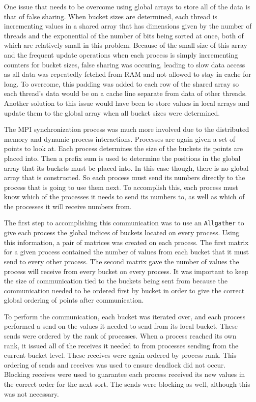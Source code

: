 \documentclass[a4paper]{article}
\begin{document}
One issue that needs to be overcome using global arrays to store all of the data is that of false sharing. When bucket sizes are determined, each
thread is incrementing values in a shared array that has dimensions given by the number of threads and the exponential of the number of bits being sorted at once,
both of which are relatively small in this problem. Because of the small size of this array and the frequent update operations when each process is
simply incrementing counters for bucket sizes, false sharing was occuring, leading to slow data access as all data was repeatedly fetched from RAM and
not allowed to stay in cache for long. To overcome, this padding was added to each row of the shared array so each thread's data would be on a cache
line separate from data of other threads. Another solution to this issue would have been to store values in local arrays and update them to the global
array when all bucket sizes were determined.

The MPI synchronization process was much more involved due to the distributed memory and dynamic process interactions. Processes are again given a set
of points to look at. Each process determines the size of the buckets its points are placed into. Then a prefix sum is used to determine the positions
in the global array that its buckets must be placed into. In this case though, there is no global array that is constructed. So each process must send
its numbers directly to the process that is going to use them next. To accomplish this, each process must know which of the processes it needs to send
its numbers to, as well as which of the processes it will receive numbers from.

The first step to accomplishing this communication was to use an \texttt{Allgather} to give each process the global indices of buckets located on
every process. Using this information, a pair of matrices was created on each process. The first matrix for a given process contained the number of
values from each bucket that it must send to every other process. The second matrix gave the number of values the process will receive from every
bucket on every process. It was important to keep the size of communication tied to the buckets being sent from because the communication needed to be
ordered first by bucket in order to give the correct global ordering of points after communication.

To perform the communication, each bucket was iterated over, and each process performed a send on the values it needed to send from its local bucket.
These sends were ordered by the rank of processes. When a process reached its own rank, it issued all of the receives it needed to from processes
sending from the current bucket level. These receives were again ordered by process rank. This ordering of sends and receives was used to ensure
deadlock did not occur. Blocking receives were used to guarantee each process received its new values in the correct order for the next sort. The
sends were blocking as well, although this was not necessary.
\end{document}
